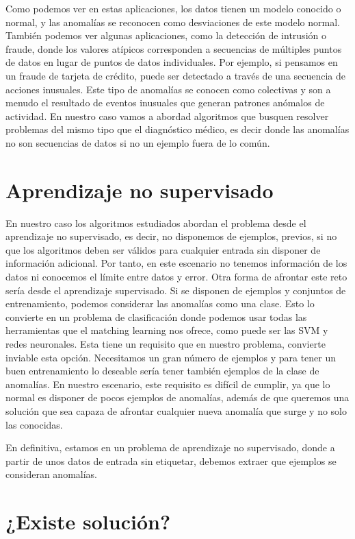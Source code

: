 Como podemos ver en estas aplicaciones, los datos tienen un modelo conocido o normal, y las anomalías se reconocen como
desviaciones de este modelo normal. También podemos ver algunas aplicaciones, como la detección de intrusión o fraude,
donde los valores atípicos corresponden a secuencias de múltiples puntos de datos en lugar de puntos de datos individuales.
Por ejemplo, si pensamos en un fraude de tarjeta de crédito, puede ser detectado a través de una secuencia de acciones
inusuales. Este tipo de anomalías se conocen como colectivas y son a menudo el resultado de eventos inusuales que generan patrones
anómalos de actividad. En nuestro caso vamos a abordad algoritmos que busquen resolver problemas del mismo tipo que el diagnóstico
médico, es decir donde las anomalías no son secuencias de datos si no un ejemplo fuera de lo común.

\section{Aprendizaje no supervisado}
En nuestro caso los algoritmos estudiados abordan el problema desde el aprendizaje no supervisado, es decir, no disponemos de ejemplos,
previos, si no que los algoritmos deben ser válidos para cualquier entrada sin disponer de información adicional. Por tanto, en este escenario
no tenemos información de los datos ni conocemos el límite entre datos y error. Otra forma de afrontar este reto sería desde el aprendizaje
supervisado. Si se disponen de ejemplos y conjuntos de entrenamiento, podemos considerar las anomalías como una clase. Esto lo convierte
en un problema de clasificación donde podemos usar todas las herramientas que el matching learning nos ofrece, como puede ser las SVM y redes
neuronales. Esta tiene un requisito que en nuestro problema, convierte inviable esta opción.
Necesitamos un gran número de ejemplos y para tener un buen entrenamiento lo deseable sería tener también ejemplos de la clase de anomalías.
En nuestro escenario, este requisito es difícil de cumplir, ya que lo normal es disponer de pocos ejemplos de anomalías, además de que queremos
una solución que sea capaza de afrontar cualquier nueva anomalía que surge y no solo las conocidas.

En definitiva, estamos en un problema de aprendizaje no supervisado, donde a partir de unos datos de entrada sin etiquetar, debemos extraer
que ejemplos se consideran anomalías.




\section{¿Existe solución?}


